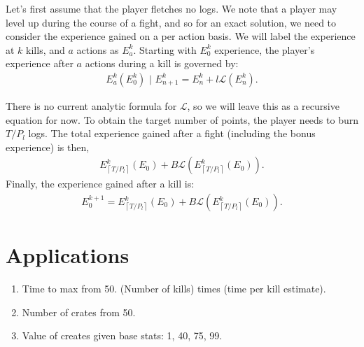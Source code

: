 Let's first assume that the player fletches no logs. We note that a player may level up during the course of a fight, and so for an exact solution, we need to consider the experience gained on a per action basis. We will label the experience at $k$ kills, and $a$ actions as $E_a^k$. Starting with $E_0^k$ experience, the player's experience after $a$ actions during a kill is governed by:
\begin{align}
	E_a^k(E_0^k)\,\,|\,\,E_{n+1}^k = E_n^k + l\mathcal{L}(E_n^k).
\end{align}

There is no current analytic formula for $\mathcal{L}$, so we will leave this as a recursive equation for now. To obtain the target number of points, the player needs to burn $T/P_l$ logs. The total experience gained after a fight (including the bonus experience) is then,
\begin{align}
	E^k_{\left\lceil T / P_l\right\rceil}(E_0) + B\mathcal{L}(E^k_{\left\lceil T / P_l\right\rceil}(E_0)).
\end{align}
Finally, the experience gained after a kill is:
\begin{align}
	E^{k+1}_0 = E^k_{\left\lceil T / P_l\right\rceil}(E_0) + B\mathcal{L}(E^k_{\left\lceil T / P_l\right\rceil}(E_0)).
\end{align}


\section{Applications}
	\begin{enumerate}
		\item Time to max from 50. (Number of kills) times (time per kill estimate).
		\item Number of crates from 50. 
		\item Value of creates given base stats: 1, 40, 75, 99.
	\end{enumerate}